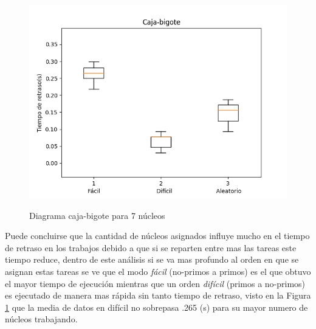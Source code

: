 \documentclass[a4paper, 11pt]{article}
\begin{document}
\begin{figure}[H]
  \centering      
  \caption{Diagrama caja-bigote para 7 núcleos}  
  \includegraphics[scale=.6]{CB_7núcleos.png}
  \label{f7}
\end{figure}
\bigskip
\bigskip
Puede concluirse que la cantidad de núcleos asignados influye mucho en el tiempo de retraso en los trabajos debido a que si se reparten entre mas las tareas este tiempo reduce, dentro de este análisis si se va mas profundo al orden en que se asignan estas tareas se ve que el modo \textit{fácil} (no-primos a primos) es el que obtuvo el mayor tiempo de ejecución mientras que un orden \textit{difícil} (primos a no-primos) es ejecutado de manera mas rápida sin tanto tiempo de retraso, visto en la Figura \ref{f7} que la media de datos en difícil no sobrepasa .265 (s) para su mayor numero de núcleos trabajando.
 \bigskip
  \bigskip




\end{document}

